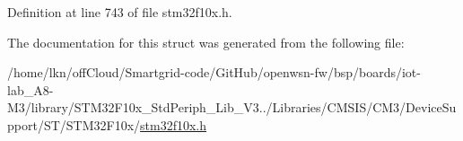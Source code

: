 Definition at line 743 of file stm32f10x.\+h.



The documentation for this struct was generated from the following file\+:\begin{DoxyCompactItemize}
\item 
/home/lkn/off\+Cloud/\+Smartgrid-\/code/\+Git\+Hub/openwsn-\/fw/bsp/boards/iot-\/lab\+\_\+\+A8-\/\+M3/library/\+S\+T\+M32\+F10x\+\_\+\+Std\+Periph\+\_\+\+Lib\+\_\+\+V3../\+Libraries/\+C\+M\+S\+I\+S/\+C\+M3/\+Device\+Support/\+S\+T/\+S\+T\+M32\+F10x/\hyperlink{iot-lab___a8-_m3_2library_2_s_t_m32_f10x___std_periph___lib___v3_85_80_2_libraries_2_c_m_s_i_s_26497265545392eb5694b064ae15018db}{stm32f10x.\+h}\end{DoxyCompactItemize}
